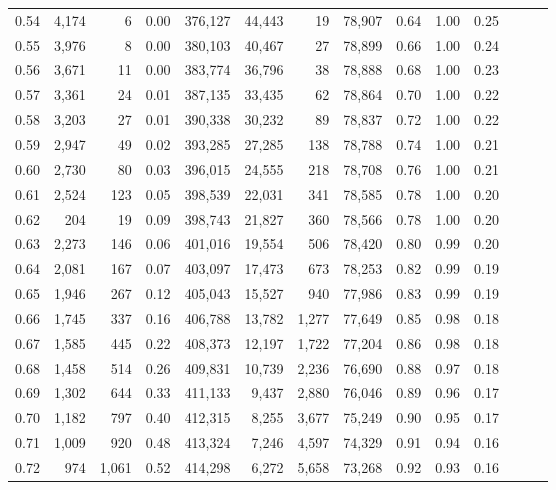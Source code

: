 \begin{tabular}{rrrrrrrrrrrrrr}
0.54 &  4,174 &      6 &  0.00 &  376,127 &   44,443 &      19 &  78,907 &  0.64 &  1.00 &      0.25 \\
0.55 &  3,976 &      8 &  0.00 &  380,103 &   40,467 &      27 &  78,899 &  0.66 &  1.00 &      0.24 \\
0.56 &  3,671 &     11 &  0.00 &  383,774 &   36,796 &      38 &  78,888 &  0.68 &  1.00 &      0.23 \\
0.57 &  3,361 &     24 &  0.01 &  387,135 &   33,435 &      62 &  78,864 &  0.70 &  1.00 &      0.22 \\
0.58 &  3,203 &     27 &  0.01 &  390,338 &   30,232 &      89 &  78,837 &  0.72 &  1.00 &      0.22 \\
0.59 &  2,947 &     49 &  0.02 &  393,285 &   27,285 &     138 &  78,788 &  0.74 &  1.00 &      0.21 \\
0.60 &  2,730 &     80 &  0.03 &  396,015 &   24,555 &     218 &  78,708 &  0.76 &  1.00 &      0.21 \\
0.61 &  2,524 &    123 &  0.05 &  398,539 &   22,031 &     341 &  78,585 &  0.78 &  1.00 &      0.20 \\
0.62 &    204 &     19 &  0.09 &  398,743 &   21,827 &     360 &  78,566 &  0.78 &  1.00 &      0.20 \\
0.63 &  2,273 &    146 &  0.06 &  401,016 &   19,554 &     506 &  78,420 &  0.80 &  0.99 &      0.20 \\
0.64 &  2,081 &    167 &  0.07 &  403,097 &   17,473 &     673 &  78,253 &  0.82 &  0.99 &      0.19 \\
0.65 &  1,946 &    267 &  0.12 &  405,043 &   15,527 &     940 &  77,986 &  0.83 &  0.99 &      0.19 \\
0.66 &  1,745 &    337 &  0.16 &  406,788 &   13,782 &   1,277 &  77,649 &  0.85 &  0.98 &      0.18 \\
0.67 &  1,585 &    445 &  0.22 &  408,373 &   12,197 &   1,722 &  77,204 &  0.86 &  0.98 &      0.18 \\
0.68 &  1,458 &    514 &  0.26 &  409,831 &   10,739 &   2,236 &  76,690 &  0.88 &  0.97 &      0.18 \\
0.69 &  1,302 &    644 &  0.33 &  411,133 &    9,437 &   2,880 &  76,046 &  0.89 &  0.96 &      0.17 \\
0.70 &  1,182 &    797 &  0.40 &  412,315 &    8,255 &   3,677 &  75,249 &  0.90 &  0.95 &      0.17 \\
0.71 &  1,009 &    920 &  0.48 &  413,324 &    7,246 &   4,597 &  74,329 &  0.91 &  0.94 &      0.16 \\
0.72 &    974 &  1,061 &  0.52 &  414,298 &    6,272 &   5,658 &  73,268 &  0.92 &  0.93 &      0.16 \\

\end{tabular}
